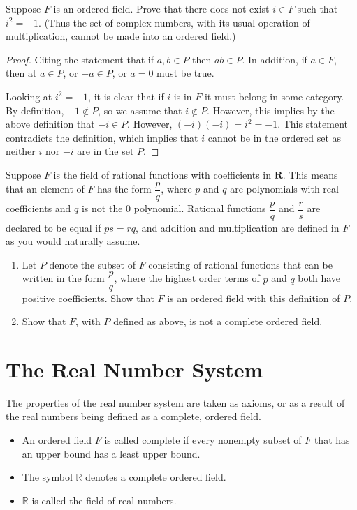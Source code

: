 \fullpageboxline
\begin{problem}
Suppose $F$ is an ordered field. Prove that there does not exist $i \in F$ such that $i^2 = -1$. (Thus the set of complex numbers, with its usual operation of multiplication, cannot be made into an ordered field.)
\end{problem}
\begin{proof}
    Citing the statement that if $a,b \in P$ then $ab \in P$. In addition, if $a \in F$, then at $a \in P$, or $-a \in P$, or $a = 0$ must be true. 

    Looking at $i^2 = -1$, it is clear that if $i$ is in $F$ it must belong in some category. By definition, $-1 \notin P$, so we assume that $i \notin P$. However, this implies by the above definition that $-i \in P$. However, $(-i)(-i) = i^2 = -1$. This statement contradicts the definition, which implies that $i$ cannot be in the ordered set as neither $i$ nor $-i$ are in the set $P$. 
\end{proof}

\fullpageboxline
\begin{problem}
Suppose $F$ is the field of rational functions with coefficients in $\mathbf{R}$. This means that an element of $F$ has the form $\dfrac{p}{q}$, where $p$ and $q$ are polynomials with real coefficients and $q$ is not the $0$ polynomial. Rational functions $\dfrac{p}{q}$ and $\dfrac{r}{s}$ are declared to be equal if $ps = rq$, and addition and multiplication are defined in $F$ as you would naturally assume.
\begin{enumerate}
  \item[(a)] Let $P$ denote the subset of $F$ consisting of rational functions that can be written in the form $\dfrac{p}{q}$, where the highest order terms of $p$ and $q$ both have positive coefficients. Show that $F$ is an ordered field with this definition of $P$.
  \item[(b)] Show that $F$, with $P$ defined as above, is not a complete ordered field.
\end{enumerate}
\end{problem}
\clearpage
\section{The Real Number System}

The properties of the real number system are taken as axioms, or as a result of the real numbers being defined as a complete, ordered field. 

\begin{definition}
    \begin{itemize}
        \item An ordered field $F$ is called complete if every nonempty subset of $F$ that has an upper bound has a least upper bound.
        \item The symbol $\mathbb{R}$ denotes a complete ordered field.
        \item $\mathbb{R}$ is called the field of real numbers.
    \end{itemize}    
\end{definition}

